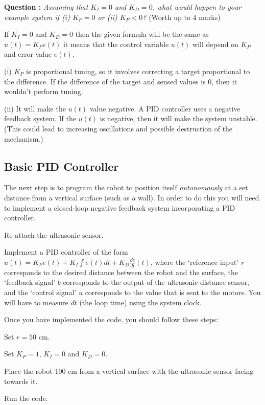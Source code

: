 \documentclass[hidelinks,a4paper,11pt]{article}
\newcounter{question}
\newcommand\myq{\refstepcounter{question}\thequestion}
\begin{document}
{\bfseries Question \myq:}  \emph{Assuming that $K_I=0$ and $K_D=0$, what would happen to your example system if (i) $K_P=0$ or (ii) $K_P<0$?} (Worth up to 4 marks)\\
\begin{mdframed}
If $K_I=0$ and $K_D=0$ then the given formula will be the same as $u(t) = K_P e(t)$ it means that the control variable $u(t)$ will depend on $K_P$ and error value $e(t)$.

(i) $K_P$ is proportional tuning, so it involves correcting a target proportional to the difference. If the difference of the target and sensed values is 0, then it wouldn't perform tuning.

(ii) It will make the $u(t)$ value negative. A PID controller uses a negative feedback system. If the $u(t)$ is negative, then it will make the system unstable. (This could lead to increasing oscillations and possible destruction of the mechanism.)
\end{mdframed}
\vspace*{\baselineskip}


\subsection{Basic PID Controller}

The next step is to program the robot to position itself \emph{autonomously} at a set distance from a vertical surface (such as a wall).  In order to do this you will need to implement a closed-loop negative feedback system incorporating a PID controller.  

\begin{todolist}
	\item Re-attach the ultrasonic sensor.
	\item Implement a PID controller of the form $u(t) = K_P e(t) + K_I \int e(t)dt + K_D \frac{de}{dt}(t)$, where the `reference input' $r$ corresponds to the desired distance between the robot and the surface, the `feedback signal' $b$ corresponds to the output of the ultrasonic distance sensor, and the `control signal' $u$ corresponds to the value that is sent to the motors.  You will have to measure $dt$ (the loop time) using the system clock.
\end{todolist}

Once you have implemented the code, you should follow these steps:
\begin{todolist}
	\item Set $r=50$ cm.
	\item Set $K_P=1$, $K_I=0$ and $K_D=0$.
	\item Place the robot 100 cm from a vertical surface with the ultrasonic sensor facing towards it.
	\item Run the code.
\end{todolist}
\end{document}
